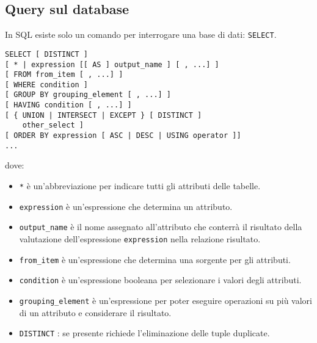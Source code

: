\documentclass[a4paper, 10pt, titlepage]{article}
\begin{document}
	\subsection{Query sul database}
		In SQL esiste solo un comando per interrogare una base di dati: \lstinline|SELECT|.
		\begin{lstlisting}
SELECT [ DISTINCT ]
[ * | expression [[ AS ] output_name ] [ , ...] ]
[ FROM from_item [ , ...] ]
[ WHERE condition ]
[ GROUP BY grouping_element [ , ...] ]
[ HAVING condition [ , ...] ]
[ { UNION | INTERSECT | EXCEPT } [ DISTINCT ]
	other_select ]
[ ORDER BY expression [ ASC | DESC | USING operator ]]
...
		\end{lstlisting}
		dove:
		\begin{itemize}
			\item \lstinline|*| è un’abbreviazione per indicare tutti gli attributi delle tabelle.
			\item \lstinline|expression| è un’espressione che determina un attributo.
			\item \lstinline|output_name| è il nome assegnato all’attributo che conterrà il risultato
			della valutazione dell’espressione \lstinline|expression| nella relazione risultato.
			\item \lstinline|from_item| è un’espressione che determina una sorgente per gli attributi.
			\item \lstinline|condition| è un’espressione booleana per selezionare i valori degli
			attributi.
			\item \lstinline|grouping_element| è un’espressione per poter eseguire operazioni su
			più valori di un attributo e considerare il risultato.
			\item \lstinline|DISTINCT| : se presente richiede l’eliminazione delle tuple duplicate.
		\end{itemize}
		
\end{document}
